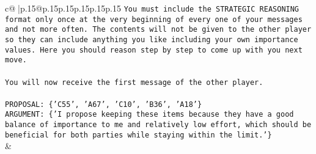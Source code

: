 \documentclass{article}
\begin{document}
{\begin{supertabular}{c@{$\;$}|p{.15\linewidth}@{}p{.15\linewidth}p{.15\linewidth}p{.15\linewidth}p{.15\linewidth}p{.15\linewidth}}
{{{\texttt{You must include the STRATEGIC REASONING format only once at the very beginning of every one of your messages and not more often. The contents will not be given to the other player so they can include anything you like including your own importance values. Here you should reason step by step to come up with you next move.} \\
\\ 
\texttt{You will now receive the first message of the other player.} \\
\\ 
\texttt{PROPOSAL: \{'C55', 'A67', 'C10', 'B36', 'A18'\} } \\
\texttt{ARGUMENT: \{'I propose keeping these items because they have a good balance of importance to me and relatively low effort, which should be beneficial for both parties while staying within the limit.'\}} \\
            }
        }
    }
    & \\ \\


\end{supertabular}}
\end{document}
